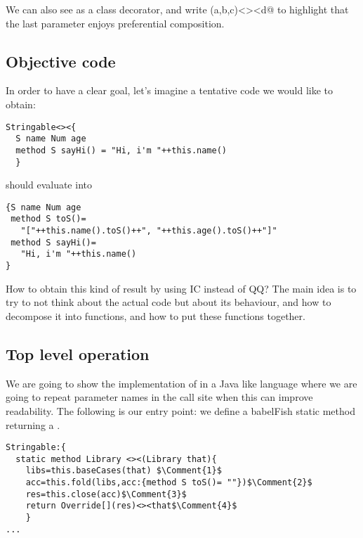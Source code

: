 We can also see \Q@Override@ as a class decorator, and
write \Q@Override(a,b,c)<><d@ to highlight that the last parameter enjoys preferential composition.

\subsection*{Objective code}
In order to have a clear goal,
let's imagine a tentative code we would like to obtain:

\begin{lstlisting}
Stringable<><{
  S name Num age
  method S sayHi() = "Hi, i'm "++this.name()
  }
\end{lstlisting}

\noindent should evaluate into

\begin{lstlisting}
{S name Num age
 method S toS()=
   "["++this.name().toS()++", "++this.age().toS()++"]"
 method S sayHi()=
   "Hi, i'm "++this.name()
}
\end{lstlisting}

How to obtain this kind of result by using IC instead of QQ?
The main idea is to try to not think about the actual code but about
its behaviour, and how to decompose it into functions, and how to
put these functions together.



\subsection*{Top level operation}
We are going to show the implementation of \Q@Stringable@ in a Java like language where
we are going to repeat parameter names in the call site when this can improve readability.
The following is our entry point: we define a babelFish static method
returning a \Q@Library@.

\begin{lstlisting}
Stringable:{
  static method Library <><(Library that){
    libs=this.baseCases(that) $\Comment{1}$
    acc=this.fold(libs,acc:{method S toS()= ""})$\Comment{2}$
    res=this.close(acc)$\Comment{3}$
    return Override[](res)<><that$\Comment{4}$
    }
...
\end{lstlisting}




